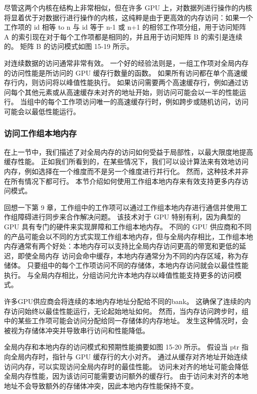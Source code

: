 尽管这两个内核在结构上非常相似，但在许多 GPU 上，对数据列进行操作的内核将显着优于对数据行进行操作的内核，这纯粹是由于更高效的内存访问：如果一个工作项的 id 相等 to n 与 id 等于 n-1 或 n+1 的相邻工作项分组，用于访问矩阵 A 的索引现在对于每个工作项都是相同的，并且用于访问矩阵 B 的索引是连续的。 矩阵 B 的访问模式如图 15-19 所示。

对连续数据的访问通常非常有效。 一个好的经验法则是，一组工作项对全局内存的访问性能是所访问的 GPU 缓存行数量的函数。 如果所有访问都在单个高速缓存行内，则访问将以峰值性能执行。 如果访问需要两个高速缓存行，例如通过访问每个其他元素或从高速缓存未对齐的地址开始，则访问可能会以一半的性能运行。 当组中的每个工作项访问唯一的高速缓存行时，例如跨步或随机访问，访问可能会以最低性能运行。

\subsubsection{访问工作组本地内存}
在上一节中，我们描述了对全局内存的访问如何受益于局部性，以最大限度地提高缓存性能。 正如我们所看到的，在某些情况下，我们可以设计算法来有效地访问内存，例如选择在一个维度而不是另一个维度进行并行化。 然而，这种技术并非在所有情况下都可行。 本节介绍如何使用工作组本地内存来有效支持更多内存访问模式。

回想一下第 9 章，工作组中的工作项可以通过工作组本地内存进行通信并使用工作组障碍进行同步来合作解决问题。 该技术对于 GPU 特别有利，因为典型的 GPU 具有专门的硬件来实现屏障和工作组本地内存。 不同的 GPU 供应商和不同的产品可能会以不同的方式实现工作组本地内存，但与全局内存相比，工作组本地内存通常有两个好处：本地内存可以支持比全局内存访问更高的带宽和更低的延迟，即使全局内存 访问会命中缓存，本地内存通常分为不同的内存区域，称为存储体。 只要组中的每个工作项访问不同的存储体，本地内存访问就会以最佳性能执行。 与全局内存相比，分组访问允许本地内存以峰值性能支持更多的访问模式。

许多GPU供应商会将连续的本地内存地址分配给不同的bank。 这确保了连续的内存访问始终以最佳性能运行，无论起始地址如何。 然而，当内存访问跨步时，组中的某些工作项可能会访问分配给同一存储体的内存地址。 发生这种情况时，会被视为存储体冲突并导致串行访问和性能降低。

全局内存和本地内存的访问模式和预期性能摘要如图 15-20 所示。 假设当 ptr 指向全局内存时，指针与 GPU 缓存行的大小对齐。 通过从缓存对齐地址开始连续访问内存，可以实现访问全局内存时的最佳性能。 访问未对齐的地址可能会降低全局内存性能，因为该访问可能需要访问额外的缓存行。 由于访问未对齐的本地地址不会导致额外的存储体冲突，因此本地内存性能保持不变。

